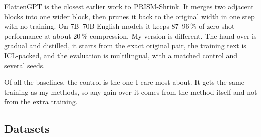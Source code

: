 \documentclass[11pt]{article}
\begin{document}
\begin{table}[t]
\centering\small
{}
\caption{Baselines and related depth-compression methods.}
\label{tab:baselines}
\end{table}

FlattenGPT \citep{flattengpt} is the closest earlier work to PRISM-Shrink. It merges two adjacent blocks into one
wider block, then prunes it back to the original width in one step with no training. On 7B--70B English models it
keeps 87--96\,\% of zero-shot performance at about 20\,\% compression. My version is different. The hand-over is
gradual and distilled, it starts from the exact original pair, the training text is ICL-packed, and the evaluation
is multilingual, with a matched control and several seeds.

Of all the baselines, the control is the one I care most about. It gets the same training as my methods, so any gain
over it comes from the method itself and not from the extra training.

\subsection{Datasets}
\end{document}
